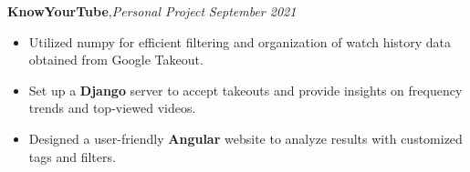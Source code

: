 \textbf{KnowYourTube}\sep{\it Personal Project } \hfill{\sl \small September 2021}\\
\vspace{-8pt}
\begin{itemize}[itemsep = -1.3 mm, leftmargin=*]
\item Utilized numpy for efficient filtering and organization of watch history data obtained from Google Takeout.
\item Set up a \textbf{Django} server to accept takeouts and provide insights on frequency trends and top-viewed videos.
\item Designed a user-friendly \textbf{Angular} website to analyze results with customized tags and filters.
\end{itemize}
